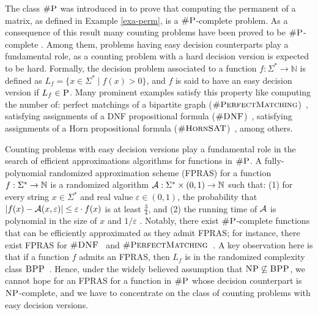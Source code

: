 
The class $\text{\sc \#P}$ was introduced in \cite{Valiant79} to prove that computing the permanent of a matrix, as defined in Example \ref{exa-perm}, is a $\text{\sc \#P}$-complete problem.
As a consequence of this result many counting problems have been proved to be $\text{\sc \#P}$-complete \cite{V79b,PB83,P86,L86,BW91,HMRS98,DG00,BW05,DS12, PS13,PS14}. Among them, problems having easy decision counterparts play a fundamental role, as a counting problem with a hard decision version is expected to be hard. Formally, the decision problem associated to a function $f : \Sigma^* \to \mathbb{N}$ is defined as $L_f = \{ x \in \Sigma^* \mid f(x) > 0 \}$, and $f$ is said to have an easy decision version if $L_f \in \text{\sc P}$. 
Many prominent examples satisfy this property like computing the number of: perfect matchings of a bipartite graph ($\textsc{\#PerfectMatching}$)~\cite{Valiant79}, satisfying assignments of a DNF propositional formula ($\textsc{\#DNF}$)~\cite{DHK05}, satisfying assignments of a Horn  propositional formula ($\textsc{\#HornSAT}$)~\cite{V79b}, among others.

Counting problems with easy decision versions play a fundamental role in the search of efficient approximations algorithms for functions in $\text{\sc \#P}$. A fully-polynomial randomized approximation scheme (FPRAS) for a function $f : \Sigma^* \to \mathbb{N}$ is a randomized algorithm ${\cal A} : \Sigma^* \times (0,1) \to \bbN$ such that: (1) for every string $x \in \Sigma^*$ and real value $\varepsilon \in (0,1)$, the probability that $|f(x) - {\cal A}(x,\varepsilon)| \leq \varepsilon \cdot f(x)$ is at least $\frac{3}{4}$, and (2) the running time of ${\cal A}$ is polynomial in the size of $x$ and $1/\varepsilon$ \cite{KL83}. Notably, there exist $\text{\sc \#P}$-complete functions that can be efficiently approximated as they admit FPRAS; for instance, there exist FPRAS for $\textsc{\#DNF}$~\cite{KL83} and $\textsc{\#PerfectMatching}$~\cite{JSV04}. A key observation here is that if a function $f$ admits an FPRAS, then $L_f$ is in the randomized complexity class $\text{\sc BPP}$~\cite{G77}. Hence, under the widely believed assumption that  $\text{\sc NP} \not\subseteq \text{\sc BPP}$, we cannot hope for an FPRAS for a function in $\text{\sc \#P}$ whose decision counterpart is $\text{\sc NP}$-complete, and we have to concentrate on the class of counting problems with easy decision versions.

